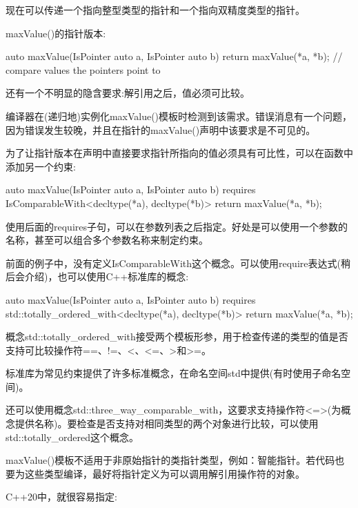 现在可以传递一个指向整型类型的指针和一个指向双精度类型的指针。


maxValue()的指针版本:

\begin{cpp}
auto maxValue(IsPointer auto a, IsPointer auto b)
{
	return maxValue(*a, *b); // compare values the pointers point to
}
\end{cpp}

还有一个不明显的隐含要求:解引用之后，值必须可比较。

编译器在(递归地)实例化maxValue()模板时检测到该需求。错误消息有一个问题，因为错误发生较晚，并且在指针的maxValue()声明中该要求是不可见的。

为了让指针版本在声明中直接要求指针所指向的值必须具有可比性，可以在函数中添加另一个约束:

\begin{cpp}
auto maxValue(IsPointer auto a, IsPointer auto b)
requires IsComparableWith<decltype(*a), decltype(*b)>
{
	return maxValue(*a, *b);
}
\end{cpp}

使用后面的requires子句，可以在参数列表之后指定。好处是可以使用一个参数的名称，甚至可以组合多个参数名称来制定约束。


前面的例子中，没有定义IsComparableWith这个概念。可以使用require表达式(稍后会介绍)，也可以使用C++标准库的概念:

\begin{cpp}
auto maxValue(IsPointer auto a, IsPointer auto b)
requires std::totally_ordered_with<decltype(*a), decltype(*b)>
{
	return maxValue(*a, *b);
}
\end{cpp}

概念std::totally\_ordered\_with接受两个模板形参，用于检查传递的类型的值是否支持可比较操作符==、!=、<、<=、>和>=。

标准库为常见约束提供了许多标准概念，在命名空间std中提供(有时使用子命名空间)。

还可以使用概念std::three\_way\_comparable\_with，这要求支持操作符<=>(为概念提供名称)。要检查是否支持对相同类型的两个对象进行比较，可以使用std::totally\_ordered这个概念。


maxValue()模板不适用于非原始指针的类指针类型，例如：智能指针。若代码也要为这些类型编译，最好将指针定义为可以调用解引用操作符的对象。

C++20中，就很容易指定:

